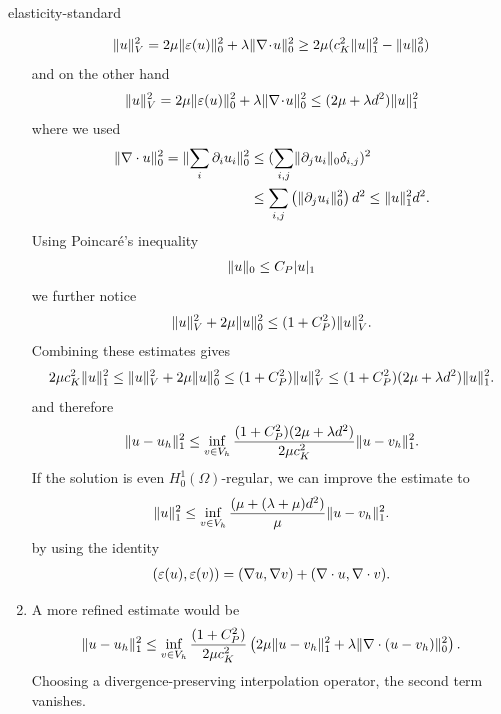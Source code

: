 \begin{Problem}{elasticity-standard}
\begin{solution}
\begin{enumerate}
   \begin{align*}
    \lVert u\rVert_V^2=2\mu\lVert\varepsilon(u)\rVert_0^2+ \lambda \lVert\nabla\!\cdot\! u\rVert_0^2\geq
    2\mu(c_K^2\lVert u\rVert_1^2-\lVert u\rVert_0^2)
   \end{align*}
   and on the other hand
   \begin{align*}
    \lVert u\rVert_V^2=2\mu\lVert\varepsilon(u)\rVert_0^2+ \lambda \lVert\nabla\!\cdot\! u\rVert_0^2\leq
    (2\mu+\lambda d^2)\lVert u\rVert_1^2
   \end{align*}
   where we used
   \begin{align*}
    \lVert\nabla \cdot u\rVert_0^2 = \lVert\sum_i \partial_i u_i\rVert_0^2 &\leq (\sum_{i,j} \lVert\partial_j u_i\rVert_0\delta_{i,j})^2\\
    & \leq \sum_{i,j} \left(\lVert\partial_j u_i\rVert_0^2\right) d^2 \leq \lVert u\rVert_1^2 d^2.
   \end{align*}
   Using Poincaré's inequality
   \begin{align*}
    \lVert u\rVert_0\leq C_P |u|_1
   \end{align*}
   we further notice
   \begin{align*}
    \lVert u\rVert_V^2+2\mu\lVert u\rVert_0^2\leq (1+C_P^2) \lVert u\rVert_V^2.
   \end{align*}
   Combining these estimates gives
   \begin{align*}
   2\mu c_K^2\lVert u\rVert_1^2\leq
    \lVert u\rVert_V^2+2\mu \lVert u\rVert_0^2\leq
    (1+C_P^2)\lVert u\rVert_V^2\leq
    (1+C_P^2)(2\mu+\lambda d^2)\lVert u\rVert_1^2.
   \end{align*}
   and therefore
   \begin{align*}
    \lVert u-u_h\rVert_1^2\leq \inf_{v\in V_h} \frac{(1+C_P^2)(2\mu+\lambda d^2)}{2\mu c_K^2}\lVert u-v_h\rVert_1^2.
   \end{align*}
   If the solution is even $H_0^1(\Omega)$-regular, we can improve the estimate to
   \begin{align*}
    \lVert u\rVert_1^2\leq \inf_{v\in V_h}\frac{(\mu+(\lambda+\mu) d^2)}{\mu}\lVert u-v_h\rVert_1^2.
   \end{align*}
   by using the identity
   \begin{align*}
    (\varepsilon(u), \varepsilon(v)) = (\nabla u, \nabla v) + (\nabla \cdot u, \nabla \cdot v).
   \end{align*}

   \item A more refined estimate would be
   \begin{align*}
    \lVert u-u_h\rVert_1^2\leq \inf_{v\in V_h}\frac{(1+C_P^2)}{2\mu c_K^2}\left(2\mu\lVert u-v_h\rVert_1^2+\lambda \lVert\nabla\cdot (u-v_h)\rVert_0^2\right).
   \end{align*}
   Choosing a divergence-preserving interpolation operator, the second term vanishes.
  \end{enumerate}
\end{solution}
\end{Problem}


